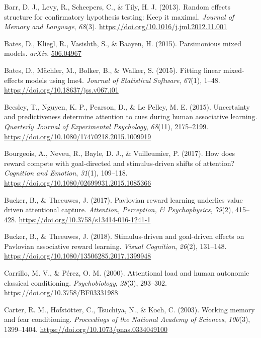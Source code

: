 \documentclass[
  man,
  floatsintext,
  longtable,
  nolmodern,
  notxfonts,
  notimes,
  mask,
  colorlinks=true,linkcolor=blue,citecolor=blue,urlcolor=blue]{apa7}
\newlength{\cslhangindent}
\newenvironment{CSLReferences}[2] %
 {\begin{list}{}{%
  \setlength{\itemindent}{0pt}
  \setlength{\leftmargin}{0pt}
  \setlength{\parsep}{0pt}
  \ifodd #1
   \setlength{\leftmargin}{\cslhangindent}
   \setlength{\itemindent}{-1\cslhangindent}
  \fi
  \setlength{\itemsep}{#2\baselineskip}}}
 {\end{list}}
\begin{document}
\begin{CSLReferences}{1}{0}
Barr, D. J., Levy, R., Scheepers, C., \& Tily, H. J. (2013). Random
effects structure for confirmatory hypothesis testing: Keep it maximal.
\emph{Journal of Memory and Language}, \emph{68}(3).
\url{https://doi.org/10.1016/j.jml.2012.11.001}

Bates, D., Kliegl, R., Vasishth, S., \& Baayen, H. (2015). Parsimonious
mixed models. \emph{arXiv}. \href{https://506.04967}{506.04967}

Bates, D., Mächler, M., Bolker, B., \& Walker, S. (2015). Fitting linear
mixed-effects models using {lme4}. \emph{Journal of Statistical
Software}, \emph{67}(1), 1--48.
\url{https://doi.org/10.18637/jss.v067.i01}

Beesley, T., Nguyen, K. P., Pearson, D., \& Le Pelley, M. E. (2015).
Uncertainty and predictiveness determine attention to cues during human
associative learning. \emph{Quarterly Journal of Experimental
Psychology}, \emph{68}(11), 2175--2199.
\url{https://doi.org/10.1080/17470218.2015.1009919}

Bourgeois, A., Neveu, R., Bayle, D. J., \& Vuilleumier, P. (2017). How
does reward compete with goal-directed and stimulus-driven shifts of
attention? \emph{Cognition and Emotion}, \emph{31}(1), 109--118.
\url{https://doi.org/10.1080/02699931.2015.1085366}

Bucker, B., \& Theeuwes, J. (2017). Pavlovian reward learning underlies
value driven attentional capture. \emph{Attention, Perception, \&
Psychophysics}, \emph{79}(2), 415--428.
\url{https://doi.org/10.3758/s13414-016-1241-1}

Bucker, B., \& Theeuwes, J. (2018). Stimulus-driven and goal-driven
effects on {Pavlovian} associative reward learning. \emph{Visual
Cognition}, \emph{26}(2), 131--148.
\url{https://doi.org/10.1080/13506285.2017.1399948}

Carrillo, M. V., \& Pérez, O. M. (2000). Attentional load and human
autonomic classical conditioning. \emph{Psychobiology}, \emph{28}(3),
293--302. \url{https://doi.org/10.3758/BF03331988}

Carter, R. M., Hofstötter, C., Tsuchiya, N., \& Koch, C. (2003). Working
memory and fear conditioning. \emph{Proceedings of the National Academy
of Sciences}, \emph{100}(3), 1399--1404.
\url{https://doi.org/10.1073/pnas.0334049100}


\end{CSLReferences}
\end{document}
